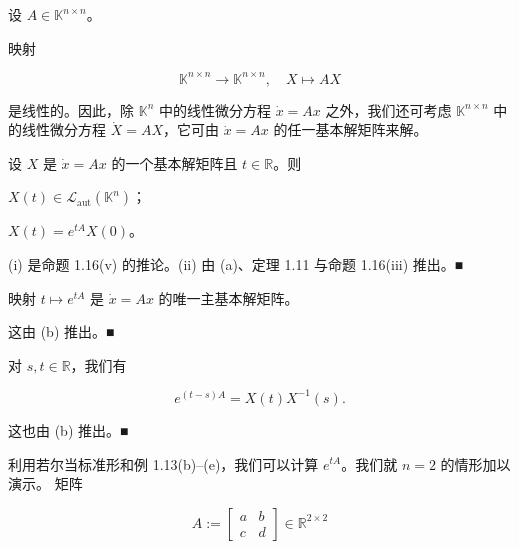 \begin{remark}

设 $ A \in \mathbb{K}^{n\times n} $。

\begin{items}
\item

映射

\[
\mathbb{K}^{n\times n} \to \mathbb{K}^{n\times n} , \quad X \mapsto AX
\]

是线性的。因此，除 $ \mathbb{K}^{n} $ 中的线性微分方程 $ \dot{x} = Ax $ 之外，我们还可考虑 $ \mathbb{K}^{n\times n} $ 中的线性微分方程 $ \dot{X} = AX $，它可由 $ \dot{x} = Ax $ 的任一基本解矩阵来解。

\item

设 $ X $ 是 $ \dot{x} = Ax $ 的一个基本解矩阵且 $ t \in \mathbb{R} $。则

\begin{subitems}
\item

$ X(t) \in \mathcal{L}_{\mathrm{aut}}(\mathbb{K}^{n}) $；

\item

$ X(t) = e^{tA}X(0) $。

\proofhead
(i) 是命题 1.16(v) 的推论。(ii) 由 (a)、定理 1.11 与命题 1.16(iii) 推出。\nobreak\hspace{0.35em}■
\end{subitems}

\item

映射 $ t \mapsto e^{tA} $ 是 $ \dot{x} = Ax $ 的唯一主基本解矩阵。

\proofhead
这由 (b) 推出。\nobreak\hspace{0.35em}■
\item

对 $ s, t \in \mathbb{R} $，我们有

\[
e^{(t-s)A} = X(t)X^{-1}(s) .
\]

\proofhead
这也由 (b) 推出。\nobreak\hspace{0.35em}■
\item

利用若尔当标准形和例 1.13(b)–(e)，我们可以计算 $ e^{tA} $。我们就 $ n = 2 $ 的情形加以演示。
矩阵

\begin{equation*}
A := \begin{bmatrix} a & b \\ c & d \end{bmatrix} \in \mathbb{R}^{2\times 2}
\end{equation*}


\end{items}
\end{remark}
